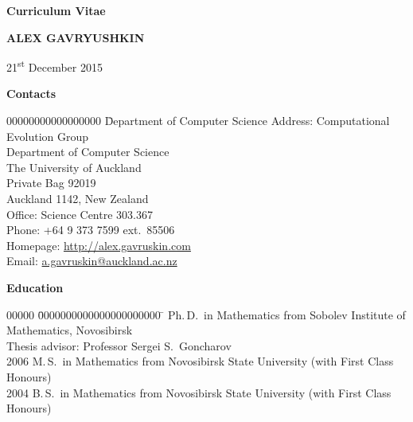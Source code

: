 \documentclass[12pt]{article}
\begin{document}
\centerline{\large \bf Curriculum Vitae}
\vskip5mm
\centerline{\Large \bfseries A\normalsize LEX \Large G\normalsize AVRYUSHKIN}
\vskip5mm
\centerline{21\textsuperscript{st} December 2015}
\vskip5mm

\centerline{\bf Contacts}
\begin{tabbing}
00000000000000000	\= Department of Computer Science	\kill
Address:		\> Computational Evolution Group\\
			\> Department of Computer Science\\
			\> The University of Auckland\\
			\> Private Bag 92019\\
			\> Auckland 1142, New Zealand\\
Office:			\> Science Centre 303.367\\
Phone:			\> +64 9 373 7599 ext.\ 85506\\
Homepage:		\> \href{http://alex.gavruskin.com}{http://alex.gavruskin.com}\\
Email:			\> \href{mailto:a.gavruskin@auckland.ac.nz}{a.gavruskin@auckland.ac.nz}\\
\iftoggle{full}{
Residency Status:	\> New Zealand permanent resident\\
Date of Birth:		\> 18\textsuperscript{th} January 1983%
}{}
\end{tabbing}

\centerline{\bf Education}
\begin{tabbing}
00000	\= 0000000000000000000000	\=		\> Ph.\,D.\ in Mathematics	\> from Sobolev Institute of Mathematics, Novosibirsk\\
	\>				\> Thesis advisor: Professor Sergei S.\ Goncharov\\
2006	\> M.\,S.\ in Mathematics	\> from Novosibirsk State University (with First Class Honours)\\
2004	\> B.\,S.\ in Mathematics	\> from Novosibirsk State University (with First Class Honours)\\
\iftoggle{full}{
2000	\> Gold Medal High School Diploma, Novokuznetsk\\
}{}
\end{tabbing}
\end{document}
